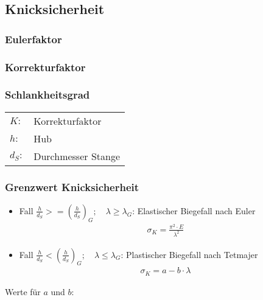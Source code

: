 \vfill
\columnbreak

\subsection{Knicksicherheit}
\subsubsection*{Eulerfaktor}

\subsubsection*{Korrekturfaktor}

\subsubsection*{Schlankheitsgrad}
\begin{tabular}{ll}
$K:$ & Korrekturfaktor \\
$h:$ & Hub \\
$d_S:$ & Durchmesser Stange
\end{tabular}


\subsubsection*{Grenzwert Knicksicherheit}

\begin{itemize}
\item Fall $\frac{h}{d_S} >= \left( \frac{h}{d_S}\right)_G; \quad \lambda \geq \lambda_G$:
Elastischer Biegefall nach Euler
\begin{align*}
\sigma_K = \frac{\pi^2 \cdot E}{\lambda^2}
\end{align*}
%
\item Fall $\frac{h}{d_S} < \left( \frac{h}{d_S}\right)_G; \quad \lambda \leq \lambda_G$: 
Plastischer Biegefall nach Tetmajer
\begin{align*}
\sigma_K = a-b \cdot \lambda
\end{align*}
\end{itemize}

Werte für $a$ und $b$: \\


